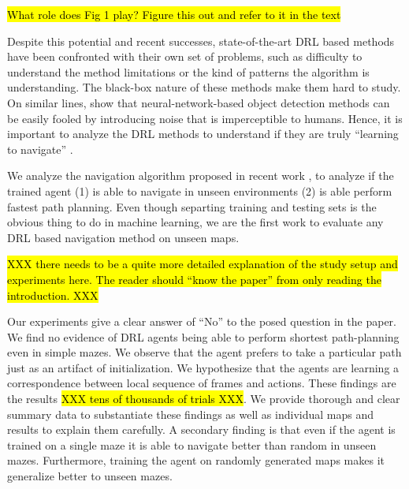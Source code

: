 \hl{What role does Fig 1 play?  Figure this out and refer to it in the text}

Despite this potential and recent successes, 
state-of-the-art DRL based methods have been confronted with their own set of problems, such as difficulty to understand the method limitations or the kind of patterns the algorithm is understanding.  The black-box nature of these methods make them hard to study.
On similar lines, \cite{NgYoClCVPR2015} show that neural-network-based object detection methods can be easily fooled by introducing noise that is imperceptible to humans. Hence, it is important to analyze the DRL methods to understand if they are truly ``learning to navigate'' \cite{MiPaViICLR2017}.

We analyze the navigation algorithm proposed in recent work \cite{MiPaViICLR2017}, to analyze if the trained agent (1) is able to navigate in unseen environments (2) is able perform fastest path planning.
Even though separting training and testing sets is the obvious thing to do in machine learning, we are the first work to evaluate any DRL based navigation method on unseen maps.

\hl{XXX there needs to be a quite more detailed explanation of the study setup and experiments here.  The reader should ``know the paper'' from only reading the introduction. XXX}

Our experiments give a clear answer of ``No'' to the posed question in the paper.
We find no evidence of DRL agents being able to perform shortest path-planning even in simple mazes. We observe that the agent prefers to take a particular path just as an artifact of initialization. We hypothesize that the agents are learning a correspondence between local sequence of frames and actions.  These findings are the results \hl{XXX tens of thousands of trials XXX}. We provide thorough and clear summary data to substantiate these findings as well as individual maps and results to explain them carefully.  A secondary finding is that even if the agent is trained on a single maze it is able to navigate better than random in unseen mazes. Furthermore, training the agent on randomly generated maps makes it generalize better to unseen mazes. 

